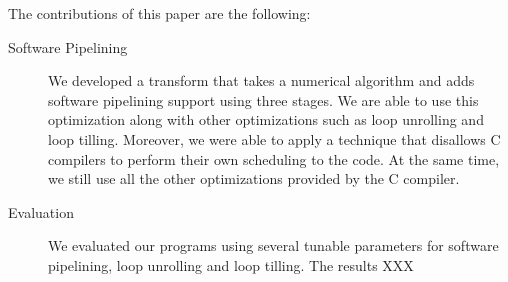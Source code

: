 \documentclass[10pt]{article}
\begin{document}
The contributions of this paper are the following:

\begin{description}
   \item[Software Pipelining] We developed a transform that takes a numerical algorithm and adds software pipelining support
   using three stages. We are able to use this optimization along with other optimizations such as loop unrolling and loop tilling.
   Moreover, we were able to apply a technique that disallows C compilers to perform their own scheduling to the code. At the same
   time, we still use all the other optimizations provided by the C compiler. 
   \item[Evaluation] We evaluated our programs using several tunable parameters for software pipelining,
   loop unrolling and loop tilling. The results XXX
\end{description}

\begin{comment}
+( ) A general technique(hack) for forcing schedules in C
+( ) An implemented set of rules in SPIRAL for tunable software pipelining.
+( ) And as a result, potentially faster code that is generated by SPIRAL that is
  comparable to an expert.
\end{comment}

\begin{comment}
   Given a loop described at the ICode level we want to do three things:
   0. Apply a transformation to turn it into a 3 software pipelined loops
   (prologue, steady state, and epilogue). The prologue and the epilogue
   space out computation as best as possible while preserving ordering. And
   the steady state mirrors the original loop in terms of the order of
   instructions, but the elements that each instruction is operating on are
   from different loop iterations.

   1. We want unroll all 3 of the loops. We do this because we don't want
   to deal with register allocation (this would involve implementing
   iterative-modulo scheduling), we would rather let the compiler figure
   out the allocations instead. As a bonus, we drop the loop overhead.

   2. Then we want to instrument those instructions with labels from goto
   statements, so we can force the schedule. By placing a label between
   each instruction and making the control flow unpredictable at compile
   time, the compiler is forced to preserve this schedule.
\end{comment}
\end{document}
